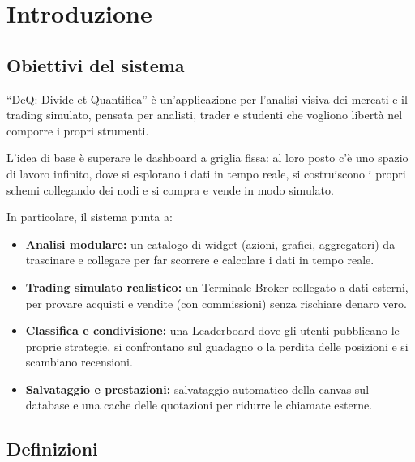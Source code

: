 \section{Introduzione}
\subsection{Obiettivi del sistema}
``DeQ: Divide et Quantifica'' è un'applicazione per l'analisi visiva dei mercati e il trading simulato, pensata per analisti, trader e studenti che vogliono libertà nel comporre i propri strumenti.

L'idea di base è superare le dashboard a griglia fissa: al loro posto c'è uno spazio di lavoro infinito, dove si esplorano i dati in tempo reale, si costruiscono i propri schemi collegando dei nodi e si compra e vende in modo simulato.

In particolare, il sistema punta a:

\begin{itemize}[itemsep=-8pt]
    \item \textbf{Analisi modulare:} un catalogo di widget (azioni, grafici, aggregatori) da trascinare e collegare per far scorrere e calcolare i dati in tempo reale.
    \item \textbf{Trading simulato realistico:} un Terminale Broker collegato a dati esterni, per provare acquisti e vendite (con commissioni) senza rischiare denaro vero.
    \item \textbf{Classifica e condivisione:} una Leaderboard dove gli utenti pubblicano le proprie strategie, si confrontano sul guadagno o la perdita delle posizioni e si scambiano recensioni.
    \item \textbf{Salvataggio e prestazioni:} salvataggio automatico della canvas sul database e una cache delle quotazioni per ridurre le chiamate esterne.
\end{itemize}


\subsection{Definizioni}

